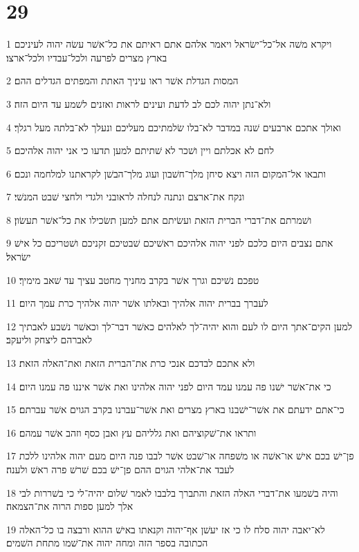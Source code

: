 \chapter{29}

\par 1 ויקרא משׁה אל־כל־ישׂראל ויאמר אלהם אתם ראיתם את כל־אשׁר עשׂה יהוה לעיניכם בארץ מצרים לפרעה ולכל־עבדיו ולכל־ארצו׃
\par 2 המסות הגדלת אשׁר ראו עיניך האתת והמפתים הגדלים ההם׃
\par 3 ולא־נתן יהוה לכם לב לדעת ועינים לראות ואזנים לשׁמע עד היום הזה׃
\par 4 ואולך אתכם ארבעים שׁנה במדבר לא־בלו שׂלמתיכם מעליכם ונעלך לא־בלתה מעל רגלך׃
\par 5 לחם לא אכלתם ויין ושׁכר לא שׁתיתם למען תדעו כי אני יהוה אלהיכם׃
\par 6 ותבאו אל־המקום הזה ויצא סיחן מלך־חשׁבון ועוג מלך־הבשׁן לקראתנו למלחמה ונכם׃
\par 7 ונקח את־ארצם ונתנה לנחלה לראובני ולגדי ולחצי שׁבט המנשׁי׃
\par 8 ושׁמרתם את־דברי הברית הזאת ועשׂיתם אתם למען תשׂכילו את כל־אשׁר תעשׂון׃
\par 9 אתם נצבים היום כלכם לפני יהוה אלהיכם ראשׁיכם שׁבטיכם זקניכם ושׁטריכם כל אישׁ ישׂראל׃
\par 10 טפכם נשׁיכם וגרך אשׁר בקרב מחניך מחטב עציך עד שׁאב מימיך׃
\par 11 לעברך בברית יהוה אלהיך ובאלתו אשׁר יהוה אלהיך כרת עמך היום׃
\par 12 למען הקים־אתך היום לו לעם והוא יהיה־לך לאלהים כאשׁר דבר־לך וכאשׁר נשׁבע לאבתיך לאברהם ליצחק וליעקב׃
\par 13 ולא אתכם לבדכם אנכי כרת את־הברית הזאת ואת־האלה הזאת׃
\par 14 כי את־אשׁר ישׁנו פה עמנו עמד היום לפני יהוה אלהינו ואת אשׁר איננו פה עמנו היום׃
\par 15 כי־אתם ידעתם את אשׁר־ישׁבנו בארץ מצרים ואת אשׁר־עברנו בקרב הגוים אשׁר עברתם׃
\par 16 ותראו את־שׁקוציהם ואת גלליהם עץ ואבן כסף וזהב אשׁר עמהם׃
\par 17 פן־ישׁ בכם אישׁ או־אשׁה או משׁפחה או־שׁבט אשׁר לבבו פנה היום מעם יהוה אלהינו ללכת לעבד את־אלהי הגוים ההם פן־ישׁ בכם שׁרשׁ פרה ראשׁ ולענה׃
\par 18 והיה בשׁמעו את־דברי האלה הזאת והתברך בלבבו לאמר שׁלום יהיה־לי כי בשׁררות לבי אלך למען ספות הרוה את־הצמאה׃
\par 19 לא־יאבה יהוה סלח לו כי אז יעשׁן אף־יהוה וקנאתו באישׁ ההוא ורבצה בו כל־האלה הכתובה בספר הזה ומחה יהוה את־שׁמו מתחת השׁמים׃
